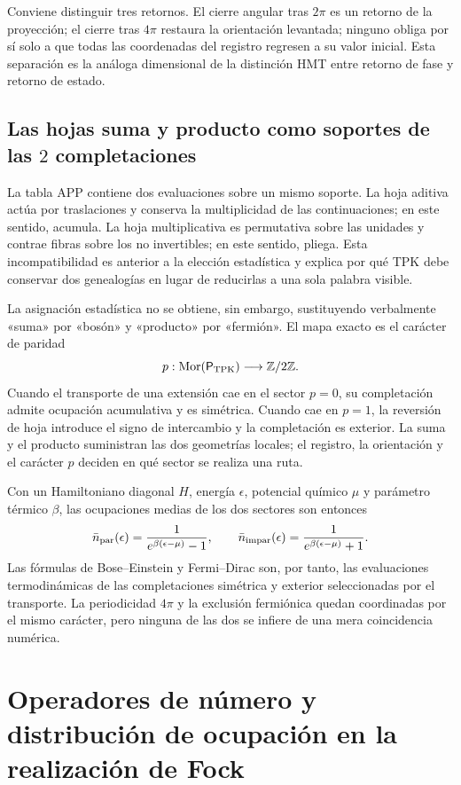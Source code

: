 Conviene distinguir tres retornos. El cierre angular tras \(2\pi\) es un
retorno de la proyección; el cierre tras \(4\pi\) restaura la orientación
levantada; ninguno obliga por sí solo a que todas las coordenadas del registro
regresen a su valor inicial. Esta separación es la análoga dimensional de la
distinción HMT entre retorno de fase y retorno de estado.

\subsection{Las hojas suma y producto como soportes de las \(2\) completaciones}

La tabla APP contiene dos evaluaciones sobre un mismo soporte. La hoja
aditiva actúa por traslaciones y conserva la multiplicidad de las
continuaciones; en este sentido, acumula. La hoja multiplicativa es
permutativa sobre las unidades y contrae fibras sobre los no invertibles; en
este sentido, pliega. Esta incompatibilidad es anterior a la elección
estadística y explica por qué TPK debe conservar dos genealogías en lugar de
reducirlas a una sola palabra visible.

La asignación estadística no se obtiene, sin embargo, sustituyendo
verbalmente «suma» por «bosón» y «producto» por «fermión». El mapa exacto es
el carácter de paridad
\[
 p:\operatorname{Mor}(\mathsf P_{\rm TPK})\longrightarrow\mathbb Z/2\mathbb Z.
\]
Cuando el transporte de una extensión cae en el sector \(p=0\), su
completación admite ocupación acumulativa y es simétrica. Cuando cae en
\(p=1\), la reversión de hoja introduce el signo de intercambio y la
completación es exterior. La suma y el producto suministran las dos
geometrías locales; el registro, la orientación y el carácter \(p\) deciden en
qué sector se realiza una ruta.

Con un Hamiltoniano diagonal \(H\), energía \(\epsilon\), potencial químico
\(\mu\) y parámetro térmico \(\beta\), las ocupaciones medias de los dos
sectores son entonces
\[
 \bar n_{\rm par}(\epsilon)
 =\frac{1}{e^{\beta(\epsilon-\mu)}-1},
 \qquad
 \bar n_{\rm impar}(\epsilon)
 =\frac{1}{e^{\beta(\epsilon-\mu)}+1}.
\]
Las fórmulas de Bose--Einstein y Fermi--Dirac son, por tanto, las
evaluaciones termodinámicas de las completaciones simétrica y exterior
seleccionadas por el transporte. La periodicidad \(4\pi\) y la exclusión
fermiónica quedan coordinadas por el mismo carácter, pero ninguna de las dos
se infiere de una mera coincidencia numérica.

\section{Operadores de número y distribución de ocupación en la realización de Fock}

